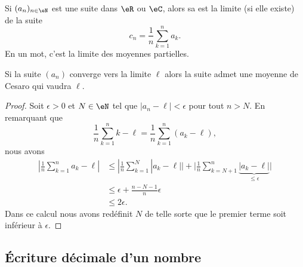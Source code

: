 \begin{definition}
    Si \( (a_n)_{n\in \eN} \) est une suite dans \( \eR\) ou \( \eC\), alors sa  est la limite (si elle existe) de la suite
    \begin{equation}
        c_n=\frac{1}{ n }\sum_{k=1}^na_k.
    \end{equation}
    En un mot, c'est la limite des moyennes partielles.
\end{definition}

\begin{lemma}       \label{LemyGjMqM}
    Si la suite \( (a_n)\) converge vers la limite \( \ell\) alors la suite admet une moyenne de Cesaro qui vaudra \( \ell\).
\end{lemma}

\begin{proof}
    Soit \( \epsilon>0\) et \( N\in \eN\) tel que \( | a_n-\ell |<\epsilon\) pour tout \( n>N\). En remarquant que
    \begin{equation}
        \frac{1}{ n }\sum_{k=1}^nk-\ell=\frac{1}{ n }\sum_{k=1}^n(a_k-\ell),
    \end{equation}
    nous avons
    \begin{subequations}
        \begin{align}
            | \frac{1}{ n }\sum_{k=1}^na_k-\ell |&\leq| \frac{1}{ n }\sum_{k=1}^N| a_k-\ell | |+\big| \frac{1}{ n }\sum_{k=N+1}^n\underbrace{| a_k-\ell |}_{\leq \epsilon} \big|\\
            &\leq \epsilon+\frac{ n-N-1 }{ n }\epsilon\\
            &\leq 2\epsilon.
        \end{align}
    \end{subequations}
    Dans ce calcul nous avons redéfinit \( N\) de telle sorte que le premier terme soit inférieur à \( \epsilon\).
\end{proof}

\subsection{Écriture décimale d'un nombre}

